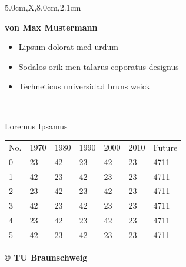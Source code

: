 \documentclass[a2paper,style=scifi,table,parskip=full]{tubsposter}
\begin{document}
  \begin{tubsposter}[bgcolor=tubsGreenLight]{5.0cm,X,8.0cm,2.1cm}
  \begin{posterrow}[bgcolor=tubsViolet,fgcolor=tubsWhite]
    \vfill
    \textbf{\large von Max Mustermann}
  \end{posterrow}
  \begin{posterrow}[X,X]
    \begin{postercol}
      \mdseries{}
      \lipsum[1]\par\lipsum[2]
      \begin{itemize}
        \item Lipsum dolorat med urdum
        \item Sodalos orik men talarus coporatus designus
        \item Techneticus universidad bruns weick
      \end{itemize}
    \end{postercol}
    \begin{postercol}[X,X]
      \begin{postersubrow}[bgimage=infozentrum,imagefit=autoclip]
        ~
      \end{postersubrow}
      \begin{postersubrow}[c,bgcolor=tubsGray20,fgcolor=tubsRed]
        \centering\itshape
        \lipsum[4]\par
        \raggedleft\upshape
        Loremus Ipsamus
      \end{postersubrow}
    \end{postercol}
  \end{posterrow}
  \begin{posterrow*}
    \large
    \begin{tabularx}{\textwidth}{lXXXXXX}
      \rowcolor{tubsGray20}
      No. & 1970 & 1980 & 1990 & 2000 & 2010 & Future \\
      0   & 23   & 42   & 23   & 42   & 23   & 4711 \\
      1   & 42   & 23   & 42   & 23   & 23   & 4711 \\
      2   & 23   & 42   & 23   & 42   & 23   & 4711 \\
      3   & 42   & 23   & 42   & 23   & 23   & 4711 \\
      4   & 23   & 42   & 23   & 42   & 23   & 4711 \\
      5   & 42   & 23   & 42   & 23   & 23   & 4711 \\
    \end{tabularx}
  \end{posterrow*}
  \begin{modrow}[bgcolor=tubsViolet,fgcolor=tubsWhite]
    \bfseries\raggedleft\copyright{} TU Braunschweig
  \end{modrow}
  \end{tubsposter}
\end{document}
